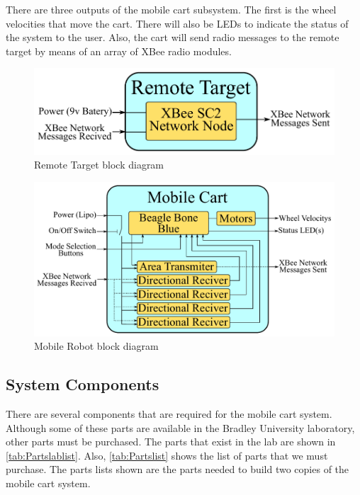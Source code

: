 \documentclass[letterpaper,12pt]{article}   %
\begin{document}
\vspace*{12pt}
\noindent
There are three outputs of the mobile cart subsystem. The first is the wheel velocities that move the cart. There will also be LEDs to indicate the status of the system to the user. Also, the cart will send radio messages to the remote target by means of an array of XBee radio modules.

\begin{figure}[h!]
  \centering
  \includegraphics[scale=0.9]{figs/remote_target_block_diagram}
  \caption{Remote Target block diagram}
  \label{fig:remote_block_diag}
\end{figure}

\begin{figure}[h!]
  \centering
  \includegraphics[scale=0.82]{figs/mobile_cart_block_diagram}
  \caption{Mobile Robot block diagram}
  \label{fig:mobile_block_diag}
\end{figure}

\subsection{System Components}
There are several components that are required for the mobile cart system. Although some of these parts are available in the Bradley University laboratory, other parts must be purchased. The parts that exist in the lab are shown in \autoref{tab:Partslablist}. Also, \autoref{tab:Partslist} shows the list of parts that we must purchase. The parts lists shown are the parts needed to build two copies of the mobile cart system.
\end{document}
